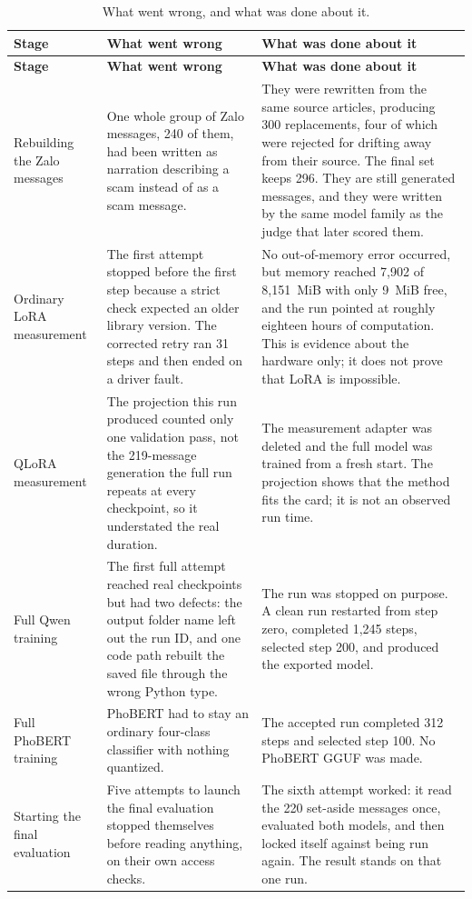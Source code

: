 \small
\begin{longtable}{p{2.8cm}p{6.1cm}p{5.1cm}}
\caption{What went wrong, and what was done about it.}\label{tab:failure-recovery-ledger}\\
\toprule
\textbf{Stage} & \textbf{What went wrong} & \textbf{What was done about it} \\
\midrule
\endfirsthead
\toprule
\textbf{Stage} & \textbf{What went wrong} & \textbf{What was done about it} \\
\midrule
\endhead
Rebuilding the Zalo messages & One whole group of Zalo messages, 240 of them, had been written as narration describing a scam instead of as a scam message. & They were rewritten from the same source articles, producing 300 replacements, four of which were rejected for drifting away from their source. The final set keeps 296. They are still generated messages, and they were written by the same model family as the judge that later scored them. \\
\addlinespace
Ordinary LoRA measurement & The first attempt stopped before the first step because a strict check expected an older library version. The corrected retry ran 31 steps and then ended on a driver fault. & No out-of-memory error occurred, but memory reached 7{,}902 of 8{,}151~MiB with only 9~MiB free, and the run pointed at roughly eighteen hours of computation. This is evidence about the hardware only; it does not prove that LoRA is impossible. \\
\addlinespace
QLoRA measurement & The projection this run produced counted only one validation pass, not the 219-message generation the full run repeats at every checkpoint, so it understated the real duration. & The measurement adapter was deleted and the full model was trained from a fresh start. The projection shows that the method fits the card; it is not an observed run time. \\
\addlinespace
Full Qwen training & The first full attempt reached real checkpoints but had two defects: the output folder name left out the run ID, and one code path rebuilt the saved file through the wrong Python type. & The run was stopped on purpose. A clean run restarted from step zero, completed 1{,}245 steps, selected step 200, and produced the exported model. \\
\addlinespace
Full PhoBERT training & PhoBERT had to stay an ordinary four-class classifier with nothing quantized. & The accepted run completed 312 steps and selected step 100. No PhoBERT GGUF was made. \\
\addlinespace
Starting the final evaluation & Five attempts to launch the final evaluation stopped themselves before reading anything, on their own access checks. & The sixth attempt worked: it read the 220 set-aside messages once, evaluated both models, and then locked itself against being run again. The result stands on that one run. \\
\bottomrule
\end{longtable}
\normalsize

